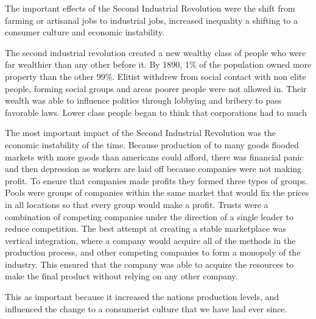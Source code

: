 The important effects of the Second Industrial Revolution were the shift from farming or artisanal jobs to industrial jobs, increased inequality a shifting to a consumer culture and economic instability.

The second industrial revolution created a new wealthy class of people who were far wealthier than any other before it.
By 1890, 1\% of the population owned more property than the other 99\%. Elitist withdrew from social contact with non elite people, forming social groups and areas poorer people were not allowed in. Their wealth was able to influence politics through lobbying and bribery to pass favorable laws. Lower class people began to think that corporations had to much 

The most important impact of the Second Industrial Revolution was the economic instability of the time.
Because production of to many goods flooded markets with more goods than americans could afford, there was financial panic and then depression as workers are laid off because companies were not making profit.
To ensure that companies made profits they formed three types of groups.
Pools were groups of companies within the same market that would fix the prices in all locations so that every group would make a profit.
Trusts were a combination of competing companies under the direction of a single leader to reduce competition.
The best attempt at creating a stable marketplace was vertical integration, where a company would acquire all of the methods in the production process, and other competing companies to form a monopoly of the industry.
This ensured that the company was able to acquire the resources to make the final product without relying on any other company.

This as important because it increased the nations production levels, and influenced the change to a consumerist culture that we have had ever since.